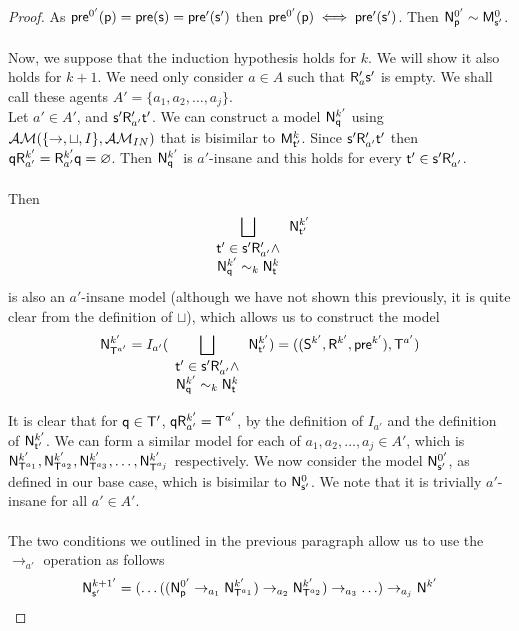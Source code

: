 \begin{proof}
	As $\evpr^{0'}(\evp) = \evpr(\evs) = \evpr'(\evs')$ then $\evpr^{0'}(\evp) \iff
  \evpr'(\evs')$.
	Then $\evM^{0'}_{\evp} \sim \evMM^0_{\evs'}$.\\
	\\
	Now, we suppose that the induction hypothesis holds for $k$.
	We will show it also holds for $k+1$.
	We need only consider $a \in A$ such that $\evR'_a \evs'$ is empty.
	We shall call these agents $A' = \{a_1,a_2,\ldots,a_j\}$.
  \\
  Let $a' \in A'$, and $\evs' \evR'_{a'} \evt'$.
  We can construct a model $\evM^{k'}_{\evq}$ using $\EM(\{\to,\sqcup,I\}, \insaneClass)$ that is
  bisimilar to $\evMM^k_{\evt'}$.
  Since $\evs' \evR'_{a'} \evt'$ then $\evq \evR^{k'}_{a'} = \evR^{k'}_{a'}
  \evq = \varnothing$.
  Then $\evM^{k'}_{\evq}$ is $a'$-insane and this holds for every $\evt' \in
  \evs' \evR'_{a'}$.\\
  \\
  Then
  \[
		\bigsqcup_{
			\begin{array}{c}
				\evt' \in \evs' \evR'_{a'} \land \\
				\evM^{k'}_{\evq} \sim_k \evM^k_\evt
			\end{array}
		} \evM^{k'}_{\evt'}
  \]
  is also an $a'$-insane model (although we have not shown this previously, it
  is quite clear from the definition of $\sqcup$), which allows us to construct the model
  \[
    \evM^{k'}_{\evT^{a'}} = I_{a'}(\bigsqcup_{
			\begin{array}{c}
				\evt' \in \evs' \evR'_{a'} \land \\
				\evM^{k'}_{\evq} \sim_k \evM^k_\evt
			\end{array}
		} \evM^{k'}_{\evt'}) = ((\evS^{k'},\evR^{k'},\evpr^{k'}),\evT^{a'})
  \]

  It is clear that for $\evq \in \evT'$, $\evq \evR^{k'}_{a'} = \evT^{a'}$, by the
  definition of $I_{a'}$ and the definition of $\evM^{k'}_{\evt'}$.
  We can form a similar model for each of $a_1,a_2,\ldots,a_j \in A'$, which is
  $\evM^{k'}_{\evT^{a_1}}, \evM^{k'}_{\evT^{a_2}}, \evM^{k'}_{\evT^{a_3}},
  \ldots, \evM^{k'}_{\evT^{a_j}}$ respectively.
  We now consider the model $\evM^{0'}_{\evs'}$, as defined in our base case,
  which is bisimilar to $\evM^0_{\evs'}$.
  We note that it is trivially $a'$-insane for all $a' \in A'$.\\
  \\
  The two conditions we outlined in the previous paragraph allow us to use the $\to_{a'}$ operation as follows
  \[
		\evM^{k+1'}_{\evs'} = (\ldots((\evM^{0'}_{\evp} \to_{a_1}
            \evM^{k'}_{\evT^{a_1}}) \to_{a_2} \evM^{k'}_{\evT^{a_2}}) \to_{a_3}
        \ldots ) \to_{a_j} \evM^{k'}
  \]


\end{proof}
